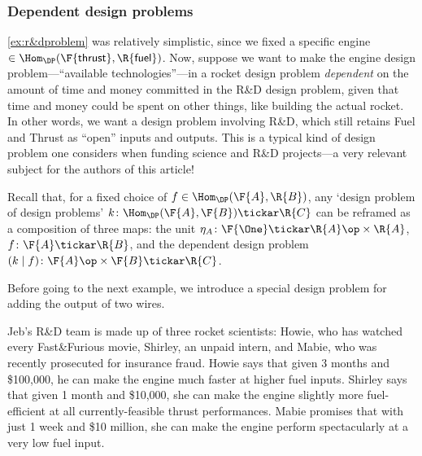\subsubsection{Dependent design problems}
\cref{ex:r&dproblem} was relatively simplistic, since we fixed a specific engine $\in \Hom_\DP(\F{\mathsf{thrust}}, \R{\mathsf{fuel}})$. Now, suppose we want to make the engine design problem---``available technologies''---in a rocket design problem \emph{dependent} on the amount of time and money committed in the R\&D design problem, given that time and money could be spent on other things, like building the actual rocket. In other words, we want a design problem involving R\&D, which still retains Fuel and Thrust as ``open'' inputs and outputs. This is a typical kind of design problem one considers when funding science and R\&D projects---a very relevant subject for the authors of this article!

Recall that, for a fixed choice of $f \in \Hom_\DP(\F{A},\R{B})$, any `design problem of design problems' $k \colon \Hom_\DP(\F{A},\F{B}) \tickar \R{C}$ can be reframed as a composition of three maps: the unit $\eta_A \colon \F{\One} \tickar \R{A}\op \times \R{A}$, $f \colon \F{A} \tickar \R{B}$, and the dependent design problem $(k \mid f) \colon \F{A}\op \times \F{B} \tickar \R{C}$.


Before going to the next example, we introduce a special design problem for adding the output of two wires.


\begin{example}
Jeb's R\&D team is made up of three rocket scientists: Howie, who has watched every Fast\&Furious movie, Shirley, an unpaid intern, and Mabie, who was recently prosecuted for insurance fraud. Howie says that given 3 months and \$100,000, he can make the engine much faster at higher fuel inputs. Shirley says that given 1 month and \$10,000, she can make the engine slightly more fuel-efficient at all currently-feasible thrust performances. Mabie promises that with just 1 week and \$10 million, she can make the engine perform spectacularly at a very low fuel input.
\end{example}

